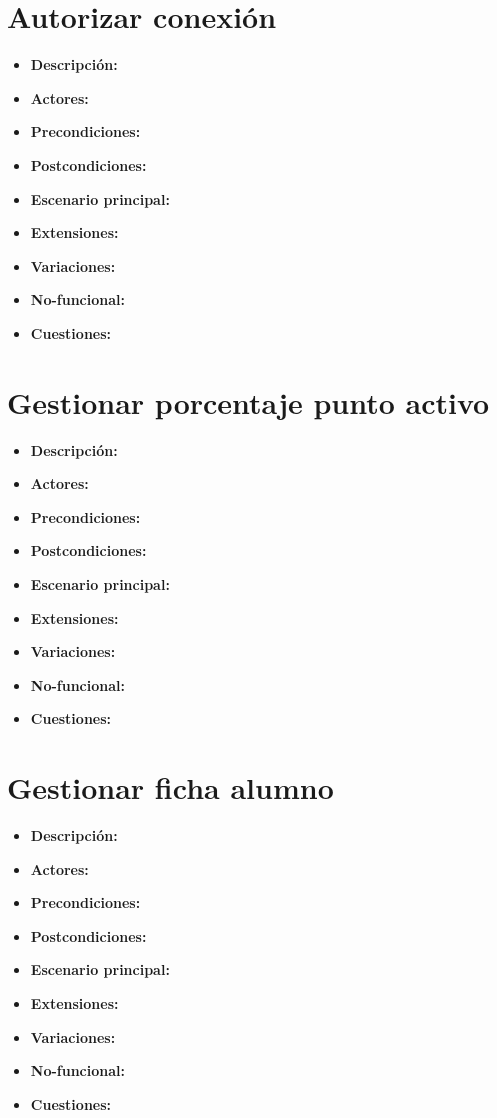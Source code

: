\documentclass[12pt,letterpaper]{article}
\begin{document}
\section{Autorizar conexión}
\begin{itemize}
	\item \textbf{Descripción:}
	\item \textbf{Actores:}
	\item \textbf{Precondiciones:}
	\item \textbf{Postcondiciones:}
	\item \textbf{Escenario principal:}
	\item \textbf{Extensiones:}
	\item \textbf{Variaciones:}
	\item \textbf{No-funcional:}
	\item \textbf{Cuestiones:}
\end{itemize}

\section{Gestionar porcentaje punto activo}
\begin{itemize}
	\item \textbf{Descripción:}
	\item \textbf{Actores:}
	\item \textbf{Precondiciones:}
	\item \textbf{Postcondiciones:}
	\item \textbf{Escenario principal:}
	\item \textbf{Extensiones:}
	\item \textbf{Variaciones:}
	\item \textbf{No-funcional:}
	\item \textbf{Cuestiones:}
\end{itemize}

\section{Gestionar ficha alumno}
\begin{itemize}
	\item \textbf{Descripción:}
	\item \textbf{Actores:}
	\item \textbf{Precondiciones:}
	\item \textbf{Postcondiciones:}
	\item \textbf{Escenario principal:}
	\item \textbf{Extensiones:}
	\item \textbf{Variaciones:}
	\item \textbf{No-funcional:}
	\item \textbf{Cuestiones:}
\end{itemize}
\end{document}
